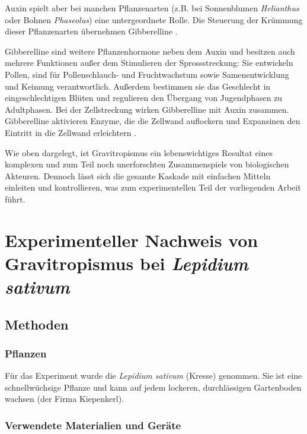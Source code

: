 \documentclass[
a4paper, 
11pt, 
ngerman,
listof=totoc,
bibliography=totocnumbered,
abstracton
]{scrreprt}
\begin{document}
Auxin spielt aber bei manchen Pflanzenarten (z.B. bei Sonnenblumen \emph{Helianthus} oder Bohnen \emph{Phaseolus}) eine untergeordnete Rolle.
Die Steuerung der Krümmung dieser Pflanzenarten übernehmen Gibberelline \parencite[502f]{Nultsch}.
 
Gibberelline sind weitere Pflanzenhormone neben dem Auxin und besitzen auch mehrere Funktionen außer dem Stimulieren der Sprossstreckung:
Sie entwickeln Pollen, sind für Pollenschlauch- und Fruchtwachstum sowie Samenentwicklung und Keimung verantwortlich. Außerdem bestimmen sie das Geschlecht in eingeschlechtigen Blüten und regulieren den Übergang von Jugendphasen zu Adultphasen. 
Bei der Zellstreckung wirken Gibberelline mit Auxin zusammen. Gibberelline aktivieren Enzyme, die die Zellwand auflockern und Expansinen den Eintritt in die Zellwand erleichtern \parencite[1122f]{campbell}.

 
Wie oben dargelegt, ist Gravitropismus ein lebenswichtiges Resultat eines komplexen und zum Teil noch unerforschten Zusammenspiels von biologischen Akteuren. Dennoch lässt sich die gesamte Kaskade mit einfachen Mitteln einleiten und kontrollieren, was zum experimentellen Teil der vorliegenden Arbeit führt. 














\chapter{Experimenteller Nachweis von Gravitropismus bei \emph{Lepidium sativum}}

\section{Methoden}

\subsection{Pflanzen}

Für das Experiment wurde die \emph{Lepidium sativum} (Kresse) genommen. Sie ist eine schnellwüchsige Pflanze und kann auf jedem lockeren, durchlässigen Gartenboden wachsen (der Firma Kiepenkerl).


\subsection{Verwendete Materialien und Geräte}
\end{document}
